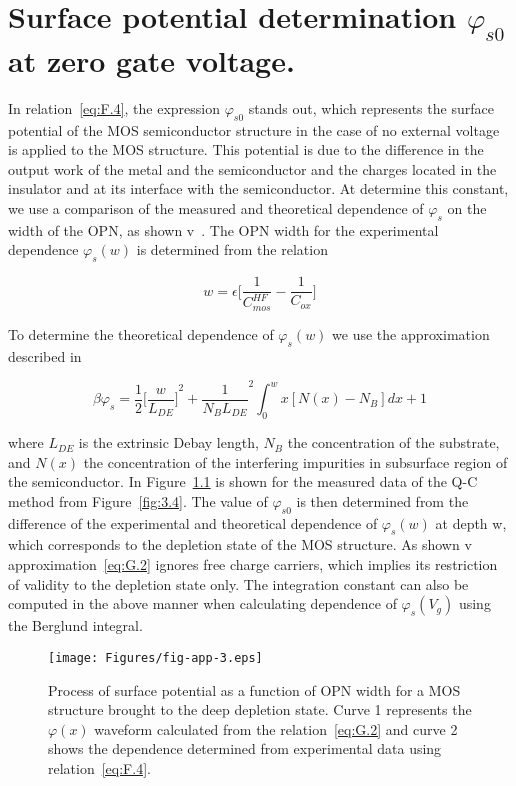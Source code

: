 
\chapter{Surface potential determination $\varphi_{s0}$ at zero gate voltage.}\label{app:AppendixG}

In relation~\ref{eq:F.4}, the expression $\varphi_{s0}$ stands out,
which represents the surface potential of the MOS semiconductor
structure in the case of no external voltage is applied to the MOS
structure.  This potential is due to the difference in the output work
of the metal and the semiconductor and the charges located in the
insulator and at its interface with the semiconductor. At determine
this constant, we use a comparison of the measured and theoretical
dependence of $\varphi_{s}$ on the width of the OPN, as shown
v~\cite{App.3}. The OPN width for the experimental dependence
$\varphi_{s}(w)$ is determined from the relation

\begin{equation}\label{eq:G.1}
  w = \epsilon \bigg[\frac{1}{C_{mos}^{HF}} - \frac{1}{C_{ox}}\bigg]
\end{equation}

To determine the theoretical dependence of $\varphi_{s}(w)$ we use the
approximation described in~\cite{App.5}

\begin{equation}\label{eq:G.2}
  \beta \varphi_{s} = \frac{1}{2} {\bigg[\frac{w}{L_{DE}}\bigg]}^2 + \frac{1}{N_{B}L_{DE}}^{2} \int_{0}^{w}x[N(x)-N_{B}]dx + 1
\end{equation}

where $L_{DE}$ is the extrinsic Debay length, $N_{B}$ the
concentration of the substrate, and $N(x)$ the concentration of the
interfering impurities in subsurface region of the semiconductor. In
Figure~\ref{fig:App.3} is shown for the measured data of the Q-C
method from Figure~\ref{fig:3.4}. The value of $\varphi_{s0}$ is then
determined from the difference of the experimental and theoretical
dependence of $\varphi_{s}(w)$ at depth w, which corresponds to the
depletion state of the MOS structure. As shown v~\cite{App.3}
approximation~\ref{eq:G.2} ignores free charge carriers, which implies
its restriction of validity to the depletion state only.  The
integration constant can also be computed in the above manner when
calculating dependence of $\varphi_{s}(V_{g})$ using the Berglund
integral.

\begin{figure}[h!]\centering
  \texttt{[image: Figures/fig-app-3.eps]}
    \caption[Surface potential as a function of OPN width for MOS
      structure driven to a deep depletion state]{Process of surface
      potential as a function of OPN width for a MOS structure brought
      to the deep depletion state.  Curve 1 represents the
      $\varphi(x)$ waveform calculated from the relation~\ref{eq:G.2}
      and curve 2 shows the dependence determined from experimental
      data using relation~\ref{eq:F.4}.}\label{fig:App.3}
\end{figure}
